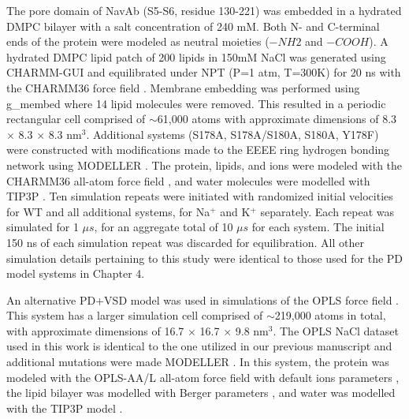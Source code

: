 \begin{refsection}
The pore domain of NavAb (S5-S6, residue 130-221) was embedded in a hydrated DMPC bilayer with a salt concentration of 240 mM. Both N- and C-terminal ends of the protein were modeled as neutral moieties ($-NH2$ and $-COOH$). A hydrated DMPC lipid patch of 200 lipids in 150mM NaCl was generated using CHARMM-GUI \cite{Wu:2014uc} and equilibrated under NPT (P=1 atm, T=300K) for 20 ns with the CHARMM36 force field \cite{Klauda:2010tn}. Membrane embedding was performed using g_membed \cite{Wolf:2010dr} where 14 lipid molecules were removed. This resulted in a periodic rectangular cell comprised of $\sim$61,000 atoms with approximate dimensions of 8.3 $\times$ 8.3 $\times$ 8.3 nm$^3$. Additional systems (S178A, S178A/S180A, S180A, Y178F) were constructed with modifications made to the EEEE ring hydrogen bonding network using MODELLER \cite{Fiser:2003we}. The protein, lipids, and ions were modeled with the CHARMM36 all-atom force field \cite{Best:2012kb,Best:2012uu,MacKerell:1998tp,Klauda:2010tn}, and water molecules were modelled with TIP3P \cite{Jorgensen:1983ty}. Ten simulation repeats were initiated with randomized initial velocities for WT and all additional systems, for Na$^+$ and K$^+$ separately. Each repeat was simulated for 1 $\mu s$, for an aggregate total of 10 $\mu s$ for each system. The initial 150 ns of each simulation repeat was discarded for equilibration. All other simulation details pertaining to this study were identical to those used for the PD model systems in Chapter 4.

An alternative PD+VSD model was used in simulations of the OPLS force field \cite{Jorgensen:1996vx,Kaminski:2001eq}. This system has a larger simulation cell comprised of $\sim$219,000 atoms in total, with approximate dimensions of 16.7 $\times$ 16.7 $\times$ 9.8 nm$^3$. The OPLS NaCl dataset used in this work is identical to the one utilized in our previous manuscript \cite{Chakrabarti:2013kd} and additional mutations were made MODELLER \cite{Fiser:2003we}. In this system, the protein was modeled with the OPLS-AA/L all-atom force field \cite{Jorgensen:1996vx,Kaminski:2001eq} with default ions parameters \cite{Aqvist:1990ud}, the lipid bilayer was modelled with Berger parameters \cite{Berger:1997bc}, and water was modelled with the TIP3P model \cite{Jorgensen:1983ty}. 



\printbibliography[heading=subbibnumbered,title={References}]
 \end{refsection}
 \pagebreak
